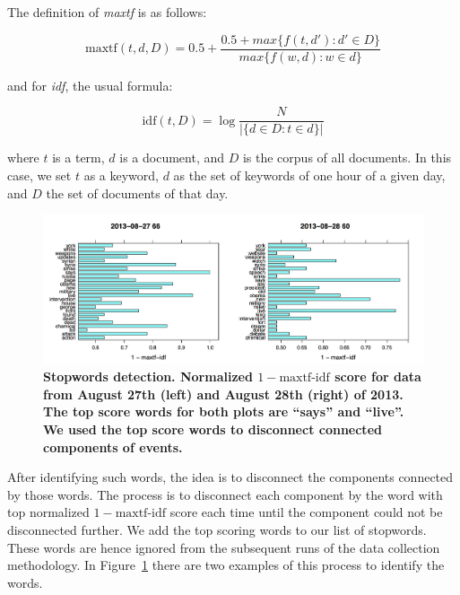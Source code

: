 The definition of \emph{maxtf} is as follows:

\begin{equation}
  \text{maxtf}(t,d,D) = 0.5 + \frac{0.5 + max\{f(t,d') : d' \in D\}}{max\{f(w,d) : w \in d\}}
\end{equation}

and for \emph{idf}, the usual formula:

\begin{equation}
  \text{idf}(t,D) = \log\frac{N}{|\{d \in D : t \in d\}|}
\end{equation}

where $t$ is a term, $d$ is a document, and $D$ is the corpus of all
documents. In this case, we set $t$ as a keyword, $d$ as the set of
keywords of one hour of a given day, and $D$ the set of documents of
that day.

\begin{figure}
  \begin{center}
    \includegraphics[width=\textwidth]{figures_supp/Plots_from_data/stopwords}
    \caption[Stopwords detection.]{\textbf{Stopwords detection.
        Normalized $1-\text{maxtf-idf}$ score for data from August
        27th (left) and August 28th (right) of 2013. The top score
        words for both plots are ``says'' and ``live''. We used the
        top score words to disconnect connected components of
        events.}}
    \label{fig:stopwords}
  \end{center}
\end{figure}


After identifying such words, the idea is to disconnect the
components connected by those words. The process is to disconnect
each component by the word with top normalized $1-\text{maxtf-idf}$
score each time until the component could not be disconnected further.
We add the top scoring words to our list of stopwords.
These words are hence ignored from the subsequent runs of the data collection methodology.
In Figure~\ref{fig:stopwords} there are two examples of this process
to identify the words.
